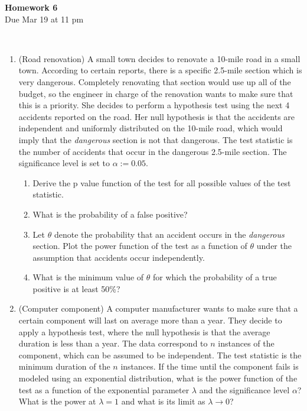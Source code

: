 \documentclass[12pt,twoside]{article}
\begin{document}
\begin{center}
{\large{\textbf{Homework 6}} } \vspace{0.2cm}\\
Due Mar 19 at 11 pm
\\
\end{center}
\\

\begin{enumerate}

\item (Road renovation) 
A small town decides to renovate a 10-mile road in a small town. According to certain reports, there is a specific 2.5-mile section which is very dangerous. Completely renovating that section would use up all of the budget, so the engineer in charge of the renovation wants to make sure that this is a priority. She decides to perform a hypothesis test using the next 4 accidents reported on the road. Her null hypothesis is that the accidents are independent and uniformly distributed on the 10-mile road, which would imply that the \emph{dangerous} section is not that dangerous. The test statistic is the number of accidents that occur in the dangerous 2.5-mile section. The significance level is set to $\alpha := 0.05$.
\begin{enumerate}
\item Derive the p value function of the test for all possible values of the test statistic. 
\item What is the probability of a false positive?
\item Let $\theta$ denote the probability that an accident occurs in the \emph{dangerous} section. Plot the power function of the test as a function of $\theta$ under the assumption that accidents occur independently. 
\item What is the minimum value of $\theta$ for which the probability of a true positive is at least 50\%?
\end{enumerate}

\item (Computer component) A computer manufacturer wants to make sure that a certain component will last on average more than a year. They decide to apply a hypothesis test, where the null hypothesis is that the average duration is less than a year. The data correspond to $n$ instances of the component, which can be assumed to be independent. The test statistic is the minimum duration of the $n$ instances. If the time until the component fails is modeled using an exponential distribution, what is the power function of the test as a function of the exponential parameter $\lambda$ and the significance level $\alpha$? What is the power at $\lambda = 1$ and what is its limit as $\lambda \rightarrow 0$?


\end{enumerate}
\end{document}

